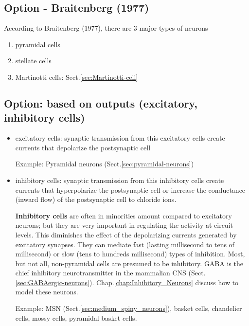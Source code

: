 \subsection{Option - Braitenberg (1977)}

According to Braitenberg (1977), there are 3 major types of neurons
\begin{enumerate}
  \item pyramidal cells
  
  \item stellate cells
  
  \item Martinotti cells: Sect.\ref{sec:Martinotti-cell}
\end{enumerate}

\subsection{Option: based on outputs (excitatory, inhibitory cells)}
\label{sec:excitatory-cell}
\label{sec:inhibitory-cell}


\begin{itemize}
  \item excitatory cells: synaptic transmission from this excitatory cells
  create currents that depolarize the postsynaptic cell
  
Example: Pyramidal neurons (Sect.\ref{sec:pyramidal-neurons})
  
  \item inhibitory cells: synaptic transmission from this inhibitory cells
  create currents that hyperpolarize the postsynaptic cell or increase the
  conductance (inward flow) of the postsynaptic cell to chloride ions.
  
  {\bf Inhibitory cells} are often in minorities amount compared to excitatory
  neurons; but they are very important in regulating the activity at circuit
  levels. This diminishes the effect of the depolarizing currents generated by
  excitatory synapses. They can mediate fast (lasting millisecond
to tens of millisecond) or slow (tens to hundreds millisecond) types of
inhibition. Most, but not all, non-pyramidal cells are presumed to be
inhibitory. GABA is the chief inhibitory neurotransmitter in the mammalian CNS
(Sect.\ref{sec:GABAergic-neurons}). Chap.\ref{chap:Inhibitory_Neurons} discuss
how to model these neurons.
  
Example: MSN (Sect.\ref{sec:medium_spiny_neurons}), basket cells, chandelier
cells, mossy cells, pyramidal basket cells.  
\end{itemize}

